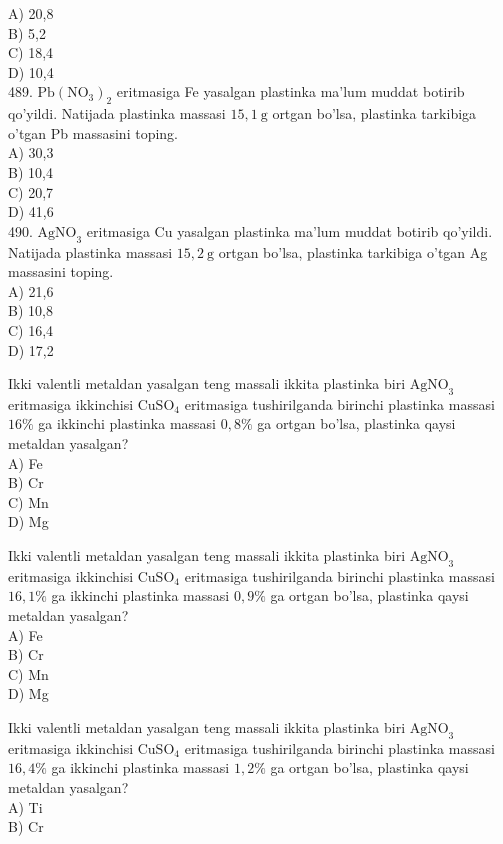 A) 20,8\\
B) 5,2\\
C) 18,4\\
D) 10,4\\
489. $\mathrm{Pb}\left(\mathrm{NO}_{3}\right)_{2}$ eritmasiga Fe yasalgan plastinka ma'lum muddat botirib qo'yildi. Natijada plastinka massasi $15,1 \mathrm{~g}$ ortgan bo'lsa, plastinka tarkibiga o'tgan Pb massasini toping.\\
A) 30,3\\
B) 10,4\\
C) 20,7\\
D) 41,6\\
490. $\mathrm{AgNO}_{3}$ eritmasiga Cu yasalgan plastinka ma'lum muddat botirib qo'yildi. Natijada plastinka massasi $15,2 \mathrm{~g}$ ortgan bo'lsa, plastinka tarkibiga o'tgan Ag massasini toping.\\
A) 21,6\\
B) 10,8\\
C) 16,4\\
D) 17,2
  \item Ikki valentli metaldan yasalgan teng massali ikkita plastinka biri $\mathrm{AgNO}_{3}$ eritmasiga ikkinchisi $\mathrm{CuSO}_{4}$ eritmasiga tushirilganda birinchi plastinka massasi $16 \%$ ga ikkinchi plastinka massasi $0,8 \%$ ga ortgan bo'lsa, plastinka qaysi metaldan yasalgan?\\
A) Fe\\
B) Cr\\
C) Mn\\
D) Mg
  \item Ikki valentli metaldan yasalgan teng massali ikkita plastinka biri $\mathrm{AgNO}_{3}$ eritmasiga ikkinchisi $\mathrm{CuSO}_{4}$ eritmasiga tushirilganda birinchi plastinka massasi\\ $16,1 \%$ ga ikkinchi plastinka massasi $0,9 \%$ ga ortgan bo'lsa, plastinka qaysi metaldan yasalgan?\\
A) Fe\\
B) Cr\\
C) Mn\\
D) Mg
  \item Ikki valentli metaldan yasalgan teng massali ikkita plastinka biri $\mathrm{AgNO}_{3}$ eritmasiga ikkinchisi $\mathrm{CuSO}_{4}$ eritmasiga tushirilganda birinchi plastinka massasi $16,4 \%$ ga ikkinchi plastinka massasi $1,2 \%$ ga ortgan bo'lsa, plastinka qaysi metaldan yasalgan?\\
A) Ti\\
B) Cr\\
